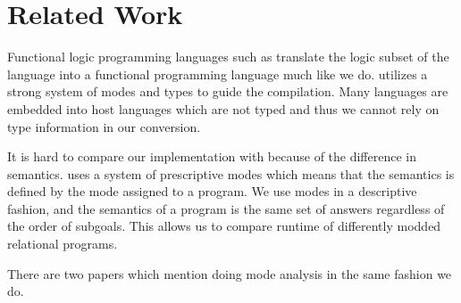 \section{Related Work}

Functional logic programming languages such as \merc translate the logic subset of the language into a functional programming language much like we do.
\merc utilizes a strong system of modes and types to guide the compilation.
Many \mk languages are embedded into host languages which are not typed and thus we cannot rely on type information in our conversion.

It is hard to compare our implementation with \merc because of the difference in semantics.
\merc uses a system of prescriptive modes which means that the semantics is defined by the mode assigned to a program.
We use modes in a descriptive fashion, and the semantics of a \mk program is the same set of answers regardless of the order of subgoals.
This allows us to compare runtime of differently modded relational programs.

There are two papers which mention doing mode analysis in the same fashion we do.



